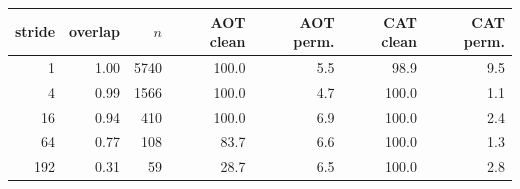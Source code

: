 \begin{tabular}{rrrrrrr}
\toprule
stride & overlap & $n$ & AOT clean & AOT perm. & CAT clean & CAT perm. \\
\midrule
1 & 1.00 & 5740 & 100.0 & 5.5 & 98.9 & 9.5 \\
4 & 0.99 & 1566 & 100.0 & 4.7 & 100.0 & 1.1 \\
16 & 0.94 & 410 & 100.0 & 6.9 & 100.0 & 2.4 \\
64 & 0.77 & 108 & 83.7 & 6.6 & 100.0 & 1.3 \\
192 & 0.31 & 59 & 28.7 & 6.5 & 100.0 & 2.8 \\
\bottomrule
\end{tabular}